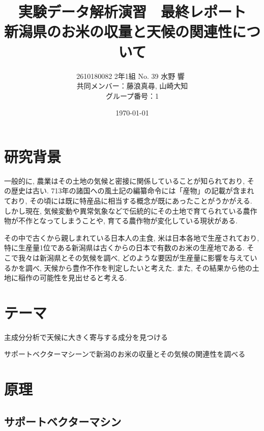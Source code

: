 \documentclass{jarticle}
\title{実験データ解析演習　最終レポート\\ 新潟県のお米の収量と天候の関連性について}
\author{2610180082 2年1組 No. 39  水野 響\ \\ 共同メンバー：藤浪真尋, 山崎大知\\グループ番号：1}
\date{\today}
\begin{document}
\maketitle
\tableofcontents%
\newpage


\section{研究背景}
一般的に, 農業はその土地の気候と密接に関係していることが知られており, その歴史は古い. 713年の諸国への風土記の編纂命令には「産物」の記載が含まれており, その頃には既に特産品に相当する概念が既にあったことがうかがえる. しかし現在, 気候変動や異常気象などで伝統的にその土地で育てられている農作物が不作となってしまうことや, 育てる農作物が変化している現状がある.

その中で古くから親しまれている日本人の主食, 米は日本各地で生産されており, 特に生産量1位である新潟県は古くからの日本で有数のお米の生産地である. そこで我々は新潟県とその気候を調べ, どのような要因が生産量に影響を与えているかを調べ, 天候から豊作不作を判定したいと考えた. また, その結果から他の土地に稲作の可能性を見出せると考える.

\hypertarget{header-n2003}{%
\section{テーマ}\label{header-n2003}}

主成分分析で天候に大きく寄与する成分を見つける

サポートベクターマシーンで新潟のお米の収量とその気候の関連性を調べる

\hypertarget{header-n2005}{%
\section{原理}\label{header-n2005}}



\hypertarget{header-n2009}{%
\subsection{サポートベクターマシン}\label{header-n2009}}
\end{document}
